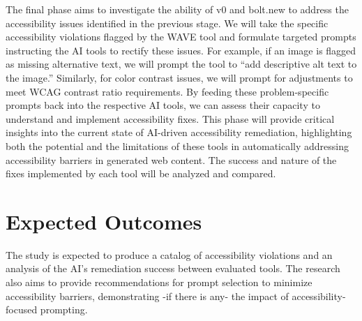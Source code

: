 \documentclass{article}
\begin{document}
The final phase aims to investigate the ability of v0 and bolt.new to address the accessibility issues identified in the previous stage.
We will take the specific accessibility violations flagged by the WAVE tool and formulate targeted prompts instructing the AI tools to rectify these issues.
For example, if an image is flagged as missing alternative text, we will prompt the tool to ``add descriptive alt text to the image.''
Similarly, for color contrast issues, we will prompt for adjustments to meet WCAG contrast ratio requirements.
By feeding these problem-specific prompts back into the respective AI tools, we can assess their capacity to understand and implement accessibility fixes.
This phase will provide critical insights into the current state of AI-driven accessibility remediation,
highlighting both the potential and the limitations of these tools in automatically addressing accessibility barriers in generated web content.
The success and nature of the fixes implemented by each tool will be analyzed and compared.

\section{Expected Outcomes}
The study is expected to produce a catalog of accessibility violations and an analysis of the AI's remediation success between evaluated tools.
The research also aims to provide recommendations for prompt selection to minimize accessibility barriers,
demonstrating -if there is any- the impact of accessibility-focused prompting.

\pagebreak



\end{document}

